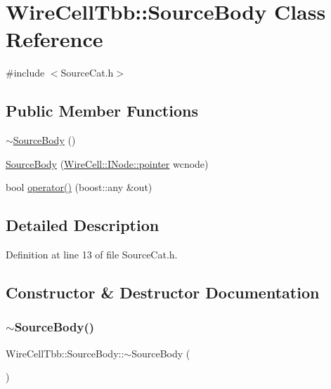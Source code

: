 \hypertarget{class_wire_cell_tbb_1_1_source_body}{}\section{Wire\+Cell\+Tbb\+:\+:Source\+Body Class Reference}
\label{class_wire_cell_tbb_1_1_source_body}


{\ttfamily \#include $<$Source\+Cat.\+h$>$}

\subsection*{Public Member Functions}
\begin{DoxyCompactItemize}
\item 
\hyperlink{class_wire_cell_tbb_1_1_source_body_a2c08a8c0466b035d9773e7df932c8d69}{$\sim$\+Source\+Body} ()
\item 
\hyperlink{class_wire_cell_tbb_1_1_source_body_a107fb76f3d6dd94760017055e96654a1}{Source\+Body} (\hyperlink{class_wire_cell_1_1_interface_a09c548fb8266cfa39afb2e74a4615c37}{Wire\+Cell\+::\+I\+Node\+::pointer} wcnode)
\item 
bool \hyperlink{class_wire_cell_tbb_1_1_source_body_a3b6306055f1df5349bc6e23c55c397b9}{operator()} (boost\+::any \&out)
\end{DoxyCompactItemize}


\subsection{Detailed Description}


Definition at line 13 of file Source\+Cat.\+h.



\subsection{Constructor \& Destructor Documentation}
\mbox{\label{class_wire_cell_tbb_1_1_source_body_a2c08a8c0466b035d9773e7df932c8d69}} 
\subsubsection{\texorpdfstring{$\sim$\+Source\+Body()}{~SourceBody()}}
{\footnotesize\ttfamily Wire\+Cell\+Tbb\+::\+Source\+Body\+::$\sim$\+Source\+Body (\begin{DoxyParamCaption}{ }\end{DoxyParamCaption})\hspace{0.3cm}{\ttfamily [inline]}}



